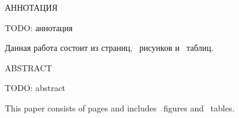 
\begin{center}
    АННОТАЦИЯ
\end{center}

TODO: аннотация

Данная работа состоит из \pageref{LastPage} страниц, \totalfigures ~рисунков и \totaltables ~таблиц.

\begin{center}
    ABSTRACT
\end{center}

TODO: abstract

This paper consists of \pageref{LastPage} pages and includes \totalfigures ~figures and \totaltables ~tables.
